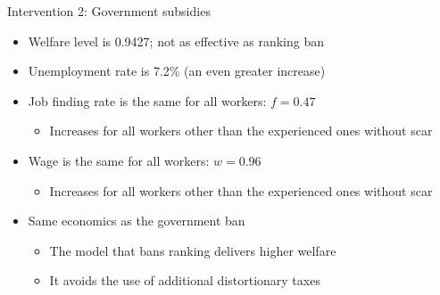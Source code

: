 \documentclass[9pt,xcolor={svgnames}]{beamer}
\begin{document}
\begin{frame}{Intervention 2: Government subsidies}
\begin{itemize}
\setlength\itemsep{1.8em}

\item Welfare level is 0.9427; not as effective as ranking ban

\item Unemployment rate is 7.2\% (an even greater increase)
    
\item Job finding rate is the same for all workers: $f = 0.47$
    \begin{itemize}
        \item Increases for all workers other than the experienced ones without scar
    \end{itemize}

\item Wage is the same for all workers: $w = 0.96$
    \begin{itemize}
        \item Increases for all workers other than the experienced ones without scar
    \end{itemize}

    \item Same economics as the government ban
    \begin{itemize}
        \item The model that bans ranking delivers higher welfare
        \item It avoids the use of additional distortionary taxes
    \end{itemize}
        
\end{itemize}
 
\end{frame}
\end{document}
